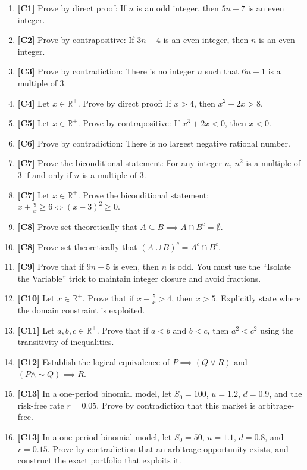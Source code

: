 \documentclass[11pt]{article}
\begin{document}
\begin{enumerate}
    \item \textbf{[C1]} Prove by direct proof: If $n$ is an odd integer, then $5n + 7$ is an even integer.
    \item \textbf{[C2]} Prove by contrapositive: If $3n - 4$ is an even integer, then $n$ is an even integer.
    \item \textbf{[C3]} Prove by contradiction: There is no integer $n$ such that $6n + 1$ is a multiple of 3.
    \item \textbf{[C4]} Let $x \in \mathbb{R}^+$. Prove by direct proof: If $x > 4$, then $x^2 - 2x > 8$.
    \item \textbf{[C5]} Let $x \in \mathbb{R}^+$. Prove by contrapositive: If $x^3 + 2x < 0$, then $x < 0$.
    \item \textbf{[C6]} Prove by contradiction: There is no largest negative rational number.
    \item \textbf{[C7]} Prove the biconditional statement: For any integer $n$, $n^2$ is a multiple of 3 if and only if $n$ is a multiple of 3.
    \item \textbf{[C7]} Let $x \in \mathbb{R}^+$. Prove the biconditional statement: $x + \frac{9}{x} \ge 6 \iff (x-3)^2 \ge 0$.
    \item \textbf{[C8]} Prove set-theoretically that $A \subseteq B \implies A \cap B^c = \emptyset$.
    \item \textbf{[C8]} Prove set-theoretically that $(A \cup B)^c = A^c \cap B^c$.
    \item \textbf{[C9]} Prove that if $9n - 5$ is even, then $n$ is odd. You must use the ``Isolate the Variable'' trick to maintain integer closure and avoid fractions.
    \item \textbf{[C10]} Let $x \in \mathbb{R}^+$. Prove that if $x - \frac{5}{x} > 4$, then $x > 5$. Explicitly state where the domain constraint is exploited.
    \item \textbf{[C11]} Let $a, b, c \in \mathbb{R}^+$. Prove that if $a < b$ and $b < c$, then $a^2 < c^2$ using the transitivity of inequalities.
    \item \textbf{[C12]} Establish the logical equivalence of $P \implies (Q \lor R)$ and $(P \land \sim Q) \implies R$.
    \item \textbf{[C13]} In a one-period binomial model, let $S_0 = 100$, $u = 1.2$, $d = 0.9$, and the risk-free rate $r = 0.05$. Prove by contradiction that this market is arbitrage-free.
    \item \textbf{[C13]} In a one-period binomial model, let $S_0 = 50$, $u = 1.1$, $d = 0.8$, and $r = 0.15$. Prove by contradiction that an arbitrage opportunity exists, and construct the exact portfolio that exploits it.

\end{enumerate}
\end{document}
